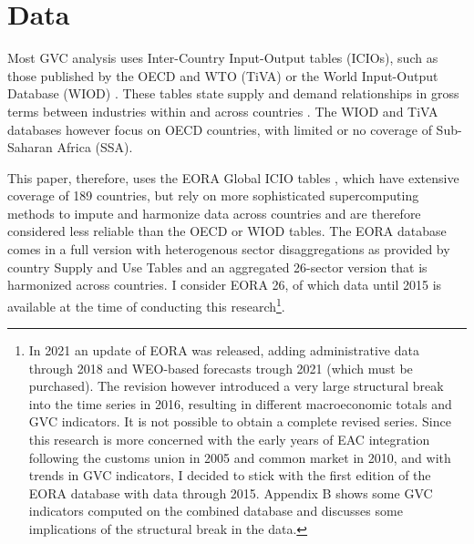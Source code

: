 \documentclass[a4paper]{article}
\begin{document}
\section{Data}

Most GVC analysis uses Inter-Country Input-Output tables (ICIOs), such as those published by the OECD and WTO (TiVA) or the World Input-Output Database (WIOD)  \citep{timmer2012world}. These tables state supply and demand relationships in gross terms between industries within and across countries \citep{Kummritz2014}. The WIOD and TiVA databases however focus on OECD countries, with limited or no coverage of Sub-Saharan Africa (SSA). \newline

This paper, therefore, uses the EORA Global ICIO tables \citep{lenzen2012mapping, lenzen2013building}, which have extensive coverage of 189 countries, but rely on more sophisticated supercomputing methods to impute and harmonize data across countries and are therefore considered less reliable than the OECD or WIOD tables. The EORA database comes in a full version with heterogenous sector disaggregations as provided by country Supply and Use Tables and an aggregated 26-sector version that is harmonized across countries. I consider EORA 26, of which data until 2015 is available at the time of conducting this research\footnote{In 2021 an update of EORA was released, adding administrative data through 2018 and WEO-based forecasts trough 2021 (which must be purchased). The revision however introduced a very large structural break into the time series in 2016, resulting in different macroeconomic totals and GVC indicators. It is not possible to obtain a complete revised series. Since this research is more concerned with the early years of EAC integration following the customs union in 2005 and common market in 2010, and with trends in GVC indicators, I decided to stick with the first edition of the EORA database with data through 2015. Appendix B shows some GVC indicators computed on the combined database and discusses some implications of the structural break in the data. }. 
\end{document}
